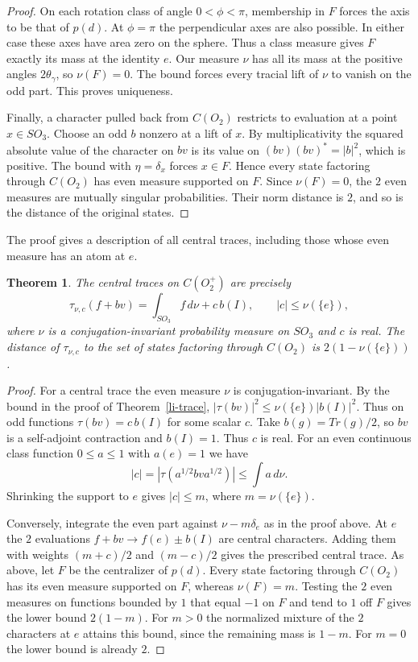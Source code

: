 \documentclass[11pt,a4paper]{article}
\newtheorem{thm}{Theorem}[section]
\begin{document}
\begin{proof}
On each rotation class of angle $0<\phi<\pi$, membership in $F$ forces the axis to be that of $p(d)$. At $\phi=\pi$ the perpendicular axes are also possible. In either case these axes have area zero on the sphere. Thus a class measure gives $F$ exactly its mass at the identity $e$. Our measure $\nu$ has all its mass at the positive angles $2\theta_\gamma$, so $\nu(F)=0$. The bound forces every tracial lift of $\nu$ to vanish on the odd part. This proves uniqueness.

Finally, a character pulled back from $C(O_2)$ restricts to evaluation at a point $x\in SO_3$. Choose an odd $b$ nonzero at a lift of $x$. By multiplicativity the squared absolute value of the character on $bv$ is its value on $(bv)(bv)^*=|b|^2$, which is positive. The bound with $\eta=\delta_x$ forces $x\in F$. Hence every state factoring through $C(O_2)$ has even measure supported on $F$. Since $\nu(F)=0$, the $2$ even measures are mutually singular probabilities. Their norm distance is $2$, and so is the distance of the original states.
\end{proof}

The proof gives a description of all central traces, including those whose even measure has an atom at $e$.

\begin{samepage}
\begin{thm}\label{lifts}
The central traces on $C(O_2^+)$ are precisely
\[
 \tau_{\nu,c}(f+bv)=\int_{SO_3}f\,d\nu+c\,b(I),\qquad |c|\leq\nu(\{e\}),
\]
where $\nu$ is a conjugation-invariant probability measure on $SO_3$ and $c$ is real. The distance of $\tau_{\nu,c}$ to the set of states factoring through $C(O_2)$ is $2(1-\nu(\{e\}))$.
\end{thm}
\end{samepage}
\begin{proof}
For a central trace the even measure $\nu$ is conjugation-invariant. By the bound in the proof of Theorem~\ref{li-trace}, $|\tau(bv)|^2\leq\nu(\{e\})|b(I)|^2$. Thus on odd functions $\tau(bv)=c\,b(I)$ for some scalar $c$. Take $b(g)=Tr(g)/2$, so $bv$ is a self-adjoint contraction and $b(I)=1$. Thus $c$ is real. For an even continuous class function $0\leq a\leq1$ with $a(e)=1$ we have
\[
 |c|=|\tau(a^{1/2}bv a^{1/2})|\leq\int a\,d\nu.
\]
Shrinking the support to $e$ gives $|c|\leq m$, where $m=\nu(\{e\})$.

Conversely, integrate the even part against $\nu-m\delta_e$ as in the proof above. At $e$ the $2$ evaluations $f+bv\to f(e)\pm b(I)$ are central characters. Adding them with weights $(m+c)/2$ and $(m-c)/2$ gives the prescribed central trace. As above, let $F$ be the centralizer of $p(d)$. Every state factoring through $C(O_2)$ has its even measure supported on $F$, whereas $\nu(F)=m$. Testing the $2$ even measures on functions bounded by $1$ that equal $-1$ on $F$ and tend to $1$ off $F$ gives the lower bound $2(1-m)$. For $m>0$ the normalized mixture of the $2$ characters at $e$ attains this bound, since the remaining mass is $1-m$. For $m=0$ the lower bound is already $2$.
\end{proof}
\end{document}
